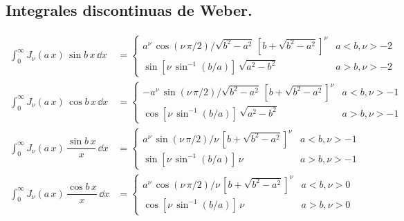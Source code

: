 \subsection{Integrales discontinuas de Weber.}
{\fontsize{12}{12}\selectfont
\begin{align*}
\int_{0}^{\infty} J_{\nu} (a \, x) \, \sin b \, x \, \dd x &=
\begin{cases}
a^{\nu} \, \cos (\nu \, \pi /2)/\sqrt{b^{2} - a^{2}} \, [b + \sqrt{b^{2} - a^{2}}]^{\nu} & a < b,  \nu > -2 \\[0.5em]
\sin [\nu \, \sin^{-1} (b/a)] \, \sqrt{a^{2} - b^{2}} & a > b, \nu > -2 
\end{cases} \\[1em]
\int_{0}^{\infty} J_{\nu} (a \, x) \, \cos b \, x \, \dd x &=
\begin{cases}
-a^{\nu} \, \sin (\nu \, \pi /2)/\sqrt{b^{2} - a^{2}} \, [b + \sqrt{b^{2} - a^{2}}]^{\nu} & a < b,  \nu > -1 \\[0.5em]
\cos [\nu \, \sin^{-1} (b/a)] \, \sqrt{a^{2} - b^{2}} & a > b, \nu > -1 
\end{cases} \\[1em]
\int_{0}^{\infty} J_{\nu} (a \, x) \, \dfrac{\sin b \, x}{x} \, \dd x &=
\begin{cases}
a^{\nu} \, \sin (\nu \, \pi /2)/ \nu \, [b + \sqrt{b^{2} - a^{2}}]^{\nu} & a < b,  \nu > -1 \\[0.5em]
\sin [\nu \, \sin^{-1} (b/a)] \, \nu & a > b, \nu > -1  
\end{cases} \\[1em]
\int_{0}^{\infty} J_{\nu} (a \, x) \, \dfrac{\cos b \, x}{x} \, \dd x &=
\begin{cases}
a^{\nu} \, \cos (\nu \, \pi /2)/ \nu \, [b + \sqrt{b^{2} - a^{2}}]^{\nu} & a < b,  \nu > 0 \\[0.5em]
\cos [\nu \, \sin^{-1} (b/a)] \, \nu & a > b, \nu > 0  
\end{cases}
\end{align*}}

